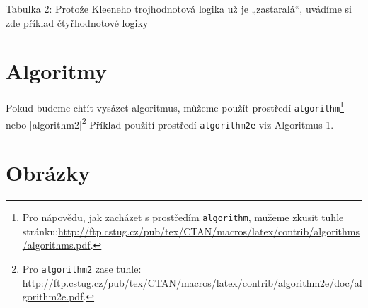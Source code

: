 \documentclass[11pt]{article}
\begin{document}
            Tabulka 2: Protože Kleeneho trojhodnotová logika už je „zastaralá“, uvádíme si zde příklad čtyřhodnotové logiky


    \section{Algoritmy}
        Pokud budeme chtít vysázet algoritmus, můžeme použít prostředí \verb|algorithm|\footnote[2]{Pro nápovědu, jak zacházet s prostředím \verb|algorithm|, mužeme zkusit tuhle stránku:\href{http://ftp.cstug.cz/pub/tex/CTAN/macros/latex/contrib/algorithms/algorithms.pdf}{http://ftp.cstug.cz/pub/tex/CTAN/macros/latex/contrib/algorithms/algorithms.pdf}.} nebo \evrb|algorithm2|\footnote[3]{Pro \verb|algorithm2| zase tuhle: \href{http://ftp.cstug.cz/pub/tex/CTAN/macros/latex/contrib/algorithm2e/doc/algorithm2e.pdf}{http://ftp.cstug.cz/pub/tex/CTAN/macros/latex/contrib/algorithm2e/doc/algorithm2e.pdf}.} Příklad použití prostředí \verb|algorithm2e| viz Algoritmus 1.


    \section{Obrázky}
\end{document}
